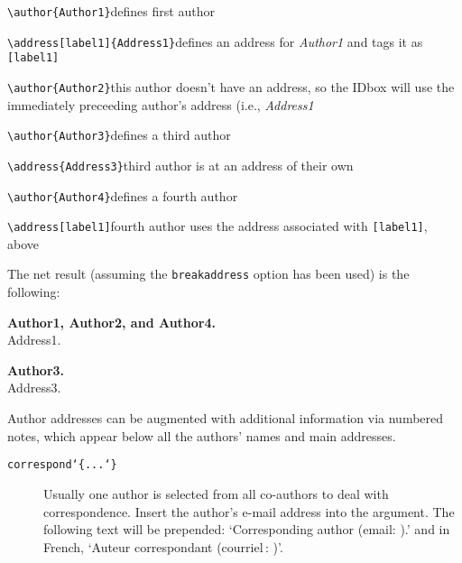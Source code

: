 \begin{description} \itemsep=0pt
   \item \verb|\author{Author1}|\quad defines first author

   \item \verb|\address[label1]{Address1}|\quad defines an address for
         {\sl Author1\/} and tags it as \verb|[label1]|

   \item \verb|\author{Author2}|\quad this author doesn't have an
         address, so the IDbox will use the immediately preceeding
         author's address (i.e., {\sl Address1}

   \item \verb|\author{Author3}|\quad defines a third author

   \item \verb|\address{Address3}|\quad third author is at an address
         of their own

   \item \verb|\author{Author4}|\quad defines a fourth author

   \item \verb|\address[label1]|\quad fourth author uses the address
         associated with \verb|[label1]|, above

         The net result (assuming the \verb|breakaddress| option has
         been used) is the following:

         {\bf Author1, Author2, and Author4.} \\ 
         Address1.

         {\bf Author3.} \\ 
         Address3.

   \item [{\sl IDbox address notes}] \mbox{}
 
         Author addresses can be augmented with additional information
         via numbered notes, which appear below all the authors' names
         and main addresses. 

   \begin{description}
      \item [{\tt \blash correspond\char`\{...\char`\}}] \mbox{}

            Usually one author is selected from all co-authors to deal
            with correspondence. Insert the author's e-mail address
            into the argument. The following text will be prepended:
            `Corresponding author (email: ).' and in French,
            `Auteur correspondant (courriel\,: )'. 



\end{description}
\end{description}
